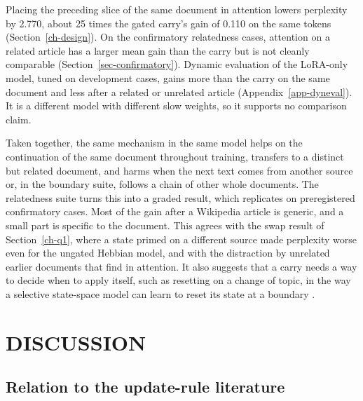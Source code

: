 \documentclass[12pt,a4paper]{report}
\begin{document}
Placing the preceding slice of the same document in attention lowers perplexity by 2.770, about 25 times the gated carry's gain of 0.110 on the same tokens (Section~\ref{ch-design}). On the confirmatory relatedness cases, attention on a related article has a larger mean gain than the carry but is not cleanly comparable (Section~\ref{sec-confirmatory}). Dynamic evaluation of the LoRA-only model, tuned on development cases, gains more than the carry on the same document and less after a related or unrelated article (Appendix~\ref{app-dyneval}). It is a different model with different slow weights, so it supports no comparison claim.

Taken together, the same mechanism in the same model helps on the continuation of the same document throughout training, transfers to a distinct but related document, and harms when the next text comes from another source or, in the boundary suite, follows a chain of other whole documents. The relatedness suite turns this into a graded result, which replicates on preregistered confirmatory cases. Most of the gain after a Wikipedia article is generic, and a small part is specific to the document. This agrees with the swap result of Section~\ref{ch-q1}, where a state primed on a different source made perplexity worse even for the ungated Hebbian model, and with the distraction by unrelated earlier documents that \citet{zhao2024analysing} find in attention. It also suggests that a carry needs a way to decide when to apply itself, such as resetting on a change of topic, in the way a selective state-space model can learn to reset its state at a boundary \citep{gu2024mamba}.

\chapter{DISCUSSION}
\label{ch-discussion}

\section{Relation to the update-rule literature}
\end{document}
